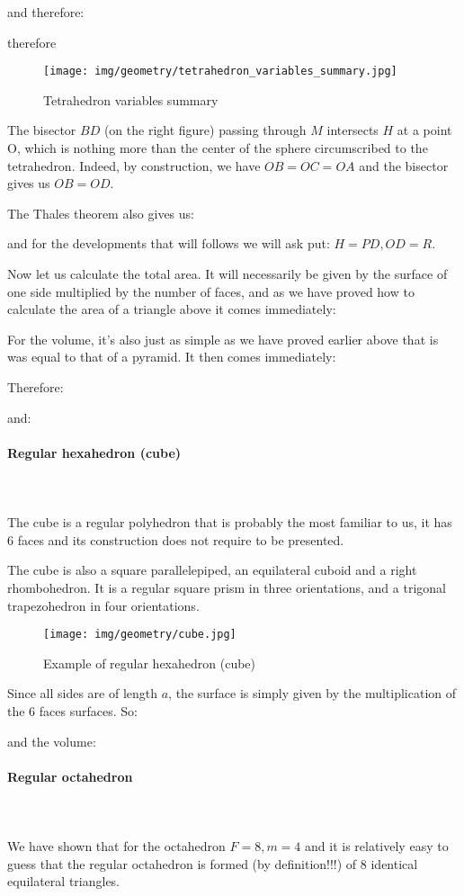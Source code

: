 {	and therefore:
	
	therefore
	
	\begin{figure}[H]
		\centering
		\texttt{[image: img/geometry/tetrahedron\_variables\_summary.jpg]}
		\caption[]{Tetrahedron variables summary}
	\end{figure}
	The bisector $BD$ (on the right figure) passing through $M$ intersects $H$ at a point O, which is nothing more than the center of the sphere circumscribed to the tetrahedron. Indeed, by construction, we have $OB=OC=OA$ and the bisector gives us $OB=OD$.
	
	The Thales theorem also gives us:
	
	and for the developments that will follows we will ask put: $H=PD, OD=R$.
	
	Now let us calculate the total area. It will necessarily be given by the surface of one side multiplied by the number of faces, and as we have proved how to calculate the area of a triangle above it comes immediately:
	
	For the volume, it's also just as simple as we have proved earlier above that is was equal to that of a pyramid. It then comes immediately:
	
	Therefore:
	
	and:
	
	
	\pagebreak
	\paragraph{Regular hexahedron (cube)}\mbox{}\\\\
	The cube is a regular polyhedron that is probably the most familiar to us, it has $6$ faces and its construction  does not require to be presented.
	
	The cube is also a square parallelepiped, an equilateral cuboid and a right rhombohedron. It is a regular square prism in three orientations, and a trigonal trapezohedron in four orientations.
	\begin{figure}[H]
		\centering
		\texttt{[image: img/geometry/cube.jpg]}
		\caption{Example of regular hexahedron (cube)}
	\end{figure}
	Since all sides are of length $a$, the surface is simply given by the multiplication of the $6$ faces surfaces. So:
	
	and the volume:
	
	
	\paragraph{Regular octahedron}\mbox{}\\\\
	We have shown that for the octahedron $F=8,m=4$ and it is relatively easy to guess that the regular octahedron is formed (by definition!!!) of $8$ identical equilateral triangles.
	
}
